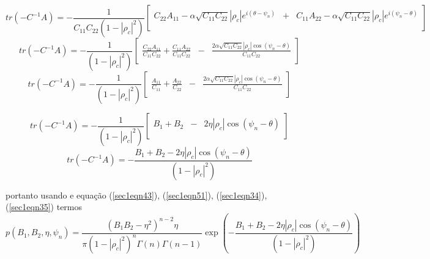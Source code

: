 \documentclass[12pt,a4paper]{article}
\begin{document}
{\footnotesize
\begin{equation}\label{sec1eqn47}
	tr(-C^{-1}A)=-\frac{1}{C_{11}C_{22}(1-\left|\rho_c\right|^2)}\left[
\begin{array}{ccc}
	C_{22}A_{11}-\alpha \sqrt{C_{11}C_{22}}\left|\rho_c \right|e^{i(\theta-\psi_n)} &+& C_{11}A_{22}-\alpha \sqrt{C_{11}C_{22}}\left|\rho_c \right|e^{i(\psi_n-\theta)}\\
\end{array}\right]
\end{equation}}
{\footnotesize
\begin{equation}\label{sec1eqn48}
	tr(-C^{-1}A)=-\frac{1}{(1-\left|\rho_c\right|^2)}\left[
\begin{array}{ccc}
	\frac{C_{22}A_{11}}{C_{11}C_{22}}+\frac{C_{11}A_{22}}{C_{11}C_{22}}&-&\frac{2\alpha \sqrt{C_{11}C_{22}}\left|\rho_c \right|\cos(\psi_n-\theta)}{C_{11}C_{22}}\\
\end{array}\right]
\end{equation}}
{\footnotesize
\begin{equation}\label{sec1eqn49}
	tr(-C^{-1}A)=-\frac{1}{(1-\left|\rho_c\right|^2)}\left[
\begin{array}{ccc}
	\frac{A_{11}}{C_{11}}+\frac{A_{22}}{C_{22}}&-&\frac{2\alpha \sqrt{C_{11}C_{22}}\left|\rho_c \right|\cos(\psi_n-\theta)}{C_{11}C_{22}}\\
\end{array}\right]
\end{equation}}

{\footnotesize
\begin{equation}\label{sec1eqn50}
	tr(-C^{-1}A)=-\frac{1}{(1-\left|\rho_c\right|^2)}\left[
\begin{array}{ccc}
	B_1+B_2&-&2\eta \left|\rho_c \right|\cos(\psi_n-\theta)\\
\end{array}\right]
\end{equation}}
{\footnotesize
\begin{equation}\label{sec1eqn51}
	tr(-C^{-1}A)=-\frac{B_1+B_2-2\eta \left|\rho_c \right|\cos(\psi_n-\theta)}{(1-\left|\rho_c\right|^2)}
\end{equation}}

portanto usando e equação (\ref{sec1eqn43}), (\ref{sec1eqn51}),   (\ref{sec1eqn34}), (\ref{sec1eqn35}) termos   
{\footnotesize
\begin{equation}\label{sec1eqn52}
	p(B_1,B_2,\eta,\psi_n)=\frac{\left(B_1B_2-\eta^2\right)^{n-2}\eta}{\pi(1-\left|\rho_c\right|^2)^{n}\Gamma(n)\Gamma(n-1)}\exp\left(-\frac{B_1+B_2-2\eta \left|\rho_c \right|\cos(\psi_n-\theta)}{(1-\left|\rho_c\right|^2)}\right)
\end{equation}}
\end{document}
